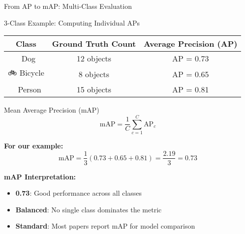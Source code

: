 \documentclass[usenames,dvipsnames]{beamer}
\begin{document}
	\begin{frame}{From AP to mAP: Multi-Class Evaluation}
		\begin{center}
		\begin{examplebox}{3-Class Example: Computing Individual APs}
		\begin{tabular}{|c|c|c|}
		\hline
		\textbf{Class} & \textbf{Ground Truth Count} & \textbf{Average Precision (AP)} \\
		\hline
		🐶 Dog & 12 objects & AP = 0.73 \\
		🚲 Bicycle & 8 objects & AP = 0.65 \\
		👨‍🦱 Person & 15 objects & AP = 0.81 \\
		\hline
		\end{tabular}
		\end{examplebox}
		\end{center}
		
		\begin{definitionbox}{Mean Average Precision (mAP)}
		$$\text{mAP} = \frac{1}{C} \sum_{c=1}^{C} \text{AP}_c$$
		
		\textbf{For our example:}
		$$\text{mAP} = \frac{1}{3}(0.73 + 0.65 + 0.81) = \frac{2.19}{3} = 0.73$$
		\end{definitionbox}
		
		\begin{keypointsbox}
		\textbf{mAP Interpretation:}
		\begin{itemize}
			\item \textbf{0.73}: Good performance across all classes
			\item \textbf{Balanced}: No single class dominates the metric
			\item \textbf{Standard}: Most papers report mAP for model comparison
		\end{itemize}
		\end{keypointsbox}
	\end{frame}
	
\end{document}
